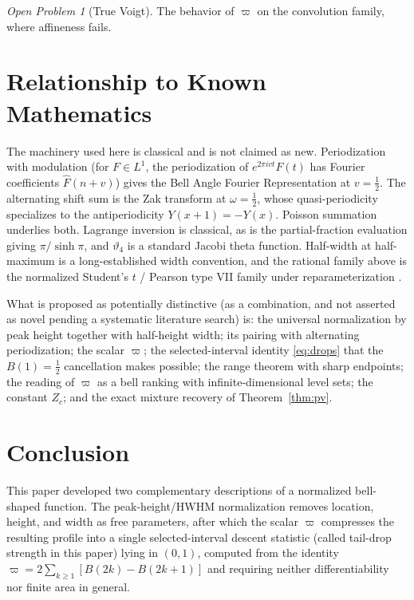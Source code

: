\documentclass[11pt]{article}
\theoremstyle{definition}
\theoremstyle{plain}
\theoremstyle{remark}
\newtheorem{openproblem}[definition]{Open Problem}
\begin{document}
\begin{openproblem}[True Voigt]\label{op:voigt}
The behavior of $\varpi$ on the convolution family, where affineness fails.
\end{openproblem}

 
\section{Relationship to Known Mathematics}
 

The machinery used here is classical and is not claimed as new. Periodization with
modulation (for $F\in L^1$, the periodization of $e^{2\pi ivt}F(t)$ has Fourier
coefficients $\widehat F(n+v)$) gives the Bell Angle Fourier Representation at
$v=\tfrac12$. The alternating shift sum is the Zak transform at $\omega=\tfrac12$, whose
quasi-periodicity specializes to the antiperiodicity $Y(x+1)=-Y(x)$. Poisson summation
underlies both. Lagrange inversion is classical, as is the partial-fraction evaluation
giving $\pi/\sinh\pi$, and $\vartheta_4$ is a standard Jacobi theta function. Half-width
at half-maximum is a long-established width convention, and the rational family above is
the normalized Student's $t$ / Pearson type VII family under reparameterization
\cite{JohnsonKotzBalakrishnan1995}.

What is proposed as potentially distinctive (as a combination, and not asserted as
novel pending a systematic literature search) is: the universal normalization by peak
height together with half-height width; its pairing with alternating periodization; the
scalar $\varpi$; the selected-interval identity \eqref{eq:drops} that the $B(1)=\tfrac12$
cancellation makes possible; the range theorem with sharp endpoints; the reading of
$\varpi$ as a bell ranking with infinite-dimensional level sets; the constant $Z_c$; and
the exact mixture recovery of Theorem~\ref{thm:pv}.

 
\section{Conclusion}
 

This paper developed two complementary descriptions of a normalized bell-shaped
function. The peak-height/HWHM normalization removes location, height, and width as
free parameters, after which the scalar $\varpi$ compresses the resulting profile into
a single selected-interval descent statistic (called tail-drop strength in this
paper) lying in $(0,1)$, computed from the identity
$\varpi=2\sum_{k\ge1}[B(2k)-B(2k+1)]$ and requiring neither differentiability nor
finite area in general.
\end{document}
